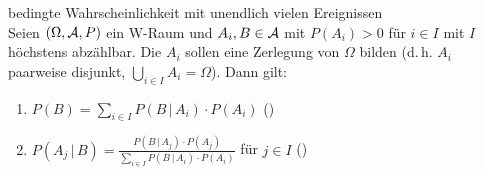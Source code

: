 \begin{Satz}{bedingte Wahrscheinlichkeit mit unendlich vielen Ereignissen}\\
    Seien $(\Omega, \mathcal{A}, P)$ ein W-Raum und $A_i, B \in \mathcal{A}$ mit $P(A_i) > 0$ für $i \in I$
    mit $I$ höchstens abzählbar.
    Die $A_i$ sollen eine Zerlegung von $\Omega$ bilden
    (d.\,h. $A_i$ paarweise disjunkt, $\bigcup_{i \in I} A_i = \Omega$).
    Dann gilt:
    \begin{enumerate}
        \item
        $P(B) = \sum_{i \in I} P(B \,|\, A_i) \cdot P(A_i)$
        ()

        \item
        $P(A_j \,|\, B) = \frac{P(B \,|\, A_j) \cdot P(A_j)}
        {\sum_{i \in I} P(B \,|\, A_i) \cdot P(A_i)}$ für $j \in I$
        ()
    \end{enumerate}
\end{Satz}

\linie
\pagebreak

